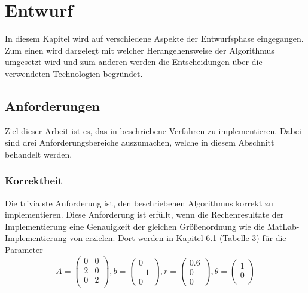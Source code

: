 \chapter{Entwurf}\label{desgin}
In diesem Kapitel wird auf verschiedene Aspekte der Entwurfsphase eingegangen.
Zum einen wird dargelegt mit welcher Herangehensweise der Algorithmus umgesetzt wird und zum anderen werden die Entscheidungen über die verwendeten Technologien begründet.

\section{Anforderungen}

Ziel dieser Arbeit ist es, das in \cite*[]{gasperini:hal-03209144} beschriebene Verfahren zu implementieren.
Dabei sind drei Anforderungsbereiche auszumachen, welche in diesem Abschnitt behandelt werden.


\subsection{Korrektheit}

Die trivialste Anforderung ist, den beschriebenen Algorithmus korrekt zu implementieren.
Diese Anforderung ist erfüllt, wenn die Rechenresultate der Implementierung eine Genauigkeit der gleichen Größenordnung wie die MatLab-Implementierung von \cite*[]{gasperini:hal-03209144} erzielen.
Dort werden in Kapitel 6.1 (Tabelle 3) für die Parameter 
\begin{equation}
    A = \begin{pmatrix}
        0 & 0 \\
        2 & 0 \\
        0 & 2 \\
    \end{pmatrix}, b = \begin{pmatrix}
        0 \\ -1 \\ 0
    \end{pmatrix},
    r = \begin{pmatrix}
        0.6 \\ 0 \\0 
    \end{pmatrix},
    \theta = \begin{pmatrix}
        1 \\ 0 \\
    \end{pmatrix}
\end{equation}

